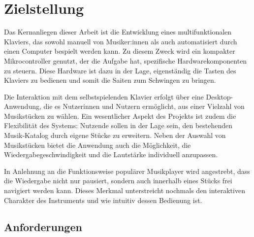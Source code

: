 
\chapter{Zielstellung} \label{Zielstellung}

\nocite{*}


Das Kernanliegen dieser Arbeit ist die Entwicklung eines multifunktionalen Klaviers,
das sowohl manuell von Musiker:innen als auch automatisiert durch einen Computer bespielt werden kann.
Zu diesem Zweck wird ein kompakter Mikrocontroller genutzt, der die Aufgabe hat, spezifische Hardwarekomponenten zu steuern.
Diese Hardware ist dazu in der Lage, eigenständig die Tasten des Klaviers zu bedienen und somit die Saiten zum Schwingen zu bringen.

Die Interaktion mit dem selbstspielenden Klavier erfolgt über eine Desktop-Anwendung, die es Nutzerinnen und Nutzern ermöglicht,
aus einer Vielzahl von Musikstücken zu wählen.
Ein wesentlicher Aspekt des Projekts ist zudem die Flexibilität des Systems: Nutzende sollen in der Lage sein,
den bestehenden Musik-Katalog durch eigene Stücke zu erweitern.
Neben der Auswahl von Musikstücken bietet die Anwendung auch die Möglichkeit,
die Wiedergabegeschwindigkeit und die Lautstärke individuell anzupassen.

In Anlehnung an die Funktionsweise populärer Musikplayer wird angestrebt,
dass die Wiedergabe nicht nur pausiert, sondern auch innerhalb eines Stücks frei navigiert werden kann.
Dieses Merkmal unterstreicht nochmals den interaktiven Charakter des Instruments und wie intuitiv dessen Bedienung ist.

\newpage
\section{Anforderungen} \label{sec:zielstellung-anforderungen}

